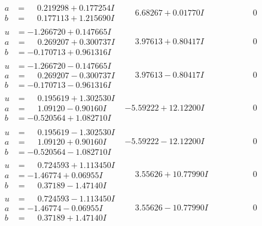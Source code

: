 \documentclass[1p]{elsarticle_modified}
\theoremstyle{definition}
\begin{document}
$$\begin{array}{c|c|c}
\begin{aligned}
a &= \phantom{-}0.219298 + 0.177254 I \\
b &= \phantom{-}0.177113 + 1.215690 I\end{aligned}
 & \phantom{-}6.68267 + 0.01770 I & \phantom{-0.000000 } 0 \\ \hline\begin{aligned}
u &= -1.266720 + 0.147665 I \\
a &= \phantom{-}0.269207 + 0.300737 I \\
b &= -0.170713 + 0.961316 I\end{aligned}
 & \phantom{-}3.97613 + 0.80417 I & \phantom{-0.000000 } 0 \\ \hline\begin{aligned}
u &= -1.266720 - 0.147665 I \\
a &= \phantom{-}0.269207 - 0.300737 I \\
b &= -0.170713 - 0.961316 I\end{aligned}
 & \phantom{-}3.97613 - 0.80417 I & \phantom{-0.000000 } 0 \\ \hline\begin{aligned}
u &= \phantom{-}0.195619 + 1.302530 I \\
a &= \phantom{-}1.09120 - 0.90160 I \\
b &= -0.520564 + 1.082710 I\end{aligned}
 & -5.59222 + 12.12200 I & \phantom{-0.000000 } 0 \\ \hline\begin{aligned}
u &= \phantom{-}0.195619 - 1.302530 I \\
a &= \phantom{-}1.09120 + 0.90160 I \\
b &= -0.520564 - 1.082710 I\end{aligned}
 & -5.59222 - 12.12200 I & \phantom{-0.000000 } 0 \\ \hline\begin{aligned}
u &= \phantom{-}0.724593 + 1.113450 I \\
a &= -1.46774 + 0.06955 I \\
b &= \phantom{-}0.37189 - 1.47140 I\end{aligned}
 & \phantom{-}3.55626 + 10.77990 I & \phantom{-0.000000 } 0 \\ \hline\begin{aligned}
u &= \phantom{-}0.724593 - 1.113450 I \\
a &= -1.46774 - 0.06955 I \\
b &= \phantom{-}0.37189 + 1.47140 I\end{aligned}
 & \phantom{-}3.55626 - 10.77990 I & \phantom{-0.000000 } 0 \\ \hline\begin{aligned}

\end{aligned}
\end{array}$$
\end{document}
